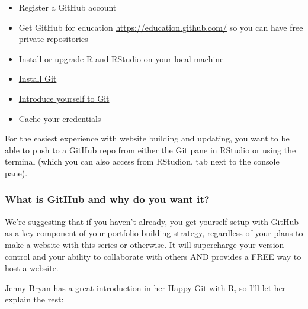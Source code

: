 \documentclass[
]{article}
\providecommand{\tightlist}{%
  \setlength{\itemsep}{0pt}\setlength{\parskip}{0pt}}
\begin{document}
\begin{itemize}
\tightlist
\item
  Register a GitHub account
\item
  Get GitHub for education
  \url{https://education.github.com/} so you can have free private
  repositories
\item
  \href{https://happygitwithr.com/install-r-rstudio.html}{Install or upgrade R and
  RStudio on your local machine}
\item
  \href{https://happygitwithr.com/install-git.html}{Install Git}
\item
  \href{https://happygitwithr.com/hello-git.html}{Introduce yourself to Git}
\item
  \href{https://happygitwithr.com/credential-caching.html}{Cache your credentials}
\end{itemize}

For the easiest experience with website building and updating, you want to be able to push to a GitHub repo from either the Git pane in RStudio or using the terminal (which you can also access from RStudion, tab next to the console pane).

\hypertarget{what-is-github-and-why-do-you-want-it}{%
\subsubsection{What is GitHub and why do you want it?}\label{what-is-github-and-why-do-you-want-it}}

We're suggesting that if you haven't already, you get yourself setup with GitHub as a key component of your portfolio building strategy, regardless of your plans to make a website with this series or otherwise. It will supercharge your version control and your ability to collaborate with others AND provides a FREE way to host a website.

Jenny Bryan has a great introduction in her \href{https://happygitwithr.com}{Happy Git with R}, so I'll let her explain the rest:
\end{document}
